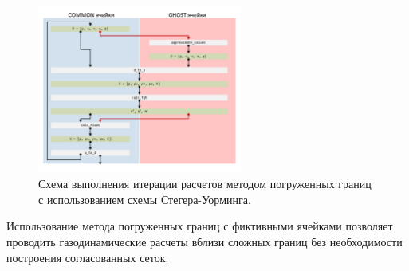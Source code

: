 \begin{figure}[ht]
\centering
\includegraphics[width=0.6\textwidth]{fig/int_ibm_scheme.pdf}
\singlespacing
{}\caption{Схема выполнения итерации расчетов методом погруженных границ с использованием схемы Стегера-Уорминга.}
\label{fig:text_4_ibm_immersed_boundary_method_cheme}
\end{figure}

Использование метода погруженных границ с фиктивными ячейками позволяет проводить газодинамические расчеты вблизи сложных границ без необходимости построения согласованных сеток.




